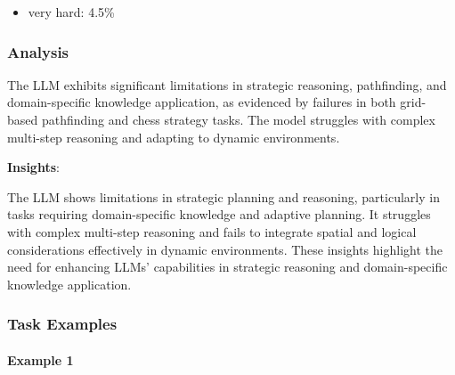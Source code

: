 \documentclass[fleqn,10pt]{wlscirep}
\providecommand{\tightlist}{%
  \setlength{\itemsep}{0pt}\setlength{\parskip}{0pt}}
\begin{document}
\begin{itemize}
\tightlist
\item
  very hard: 4.5\%
\end{itemize}

\hypertarget{analysis-15}{%
\subsubsection{Analysis}\label{analysis-15}}

The LLM exhibits significant limitations in strategic reasoning,
pathfinding, and domain-specific knowledge application, as evidenced by
failures in both grid-based pathfinding and chess strategy tasks. The
model struggles with complex multi-step reasoning and adapting to
dynamic environments.

\textbf{Insights}:

The LLM shows limitations in strategic planning and reasoning,
particularly in tasks requiring domain-specific knowledge and adaptive
planning. It struggles with complex multi-step reasoning and fails to
integrate spatial and logical considerations effectively in dynamic
environments. These insights highlight the need for enhancing LLMs'
capabilities in strategic reasoning and domain-specific knowledge
application.

\hypertarget{task-examples-15}{%
\subsubsection{Task Examples}\label{task-examples-15}}

\hypertarget{example-1-15}{%
\paragraph{Example 1}\label{example-1-15}}
\end{document}
